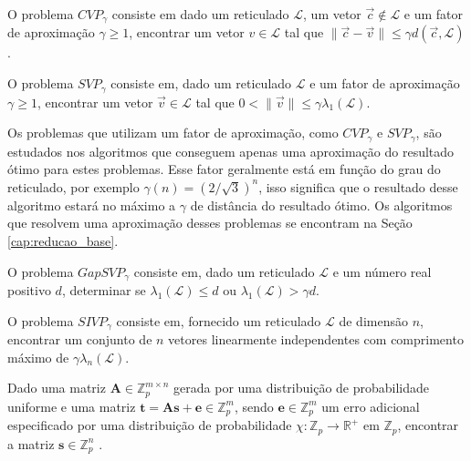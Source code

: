     \begin{definition}
        O problema $CVP_\gamma$ consiste em dado um reticulado $\mathcal{L}$, um vetor $\vec{c} \notin \mathcal{L}$ e um fator de aproximação $\gamma \ge 1$, encontrar um vetor $v \in \mathcal{L}$ tal que $\|\vec{c} - \vec{v}\| \le \gamma d(\vec{c}, \mathcal{L})$.
    \end{definition}

    \begin{definition}
         O problema $SVP_\gamma$ consiste em, dado um reticulado $\mathcal{L}$ e um fator de aproximação $\gamma \ge 1$, encontrar um vetor $\vec{v} \in \mathcal{L}$ tal que $0 < \lVert \vec{v} \rVert \le \gamma \lambda_{1}(\mathcal{L})$. 
    \end{definition}

    Os problemas que utilizam um fator de aproximação, como $CVP_\gamma$ e $SVP_\gamma$, são estudados nos algoritmos que conseguem apenas uma aproximação do resultado ótimo para estes problemas. Esse fator geralmente está em função do grau do reticulado, por exemplo $\gamma(n) = (2 / \sqrt{3})^n$, isso significa que o resultado desse algoritmo estará no máximo a $\gamma$ de distância do resultado ótimo. Os algoritmos que resolvem uma aproximação desses problemas se encontram na Seção \ref{cap:reducao_base}.

     \begin{definition}
        O problema $GapSVP_\gamma$ consiste em, dado um reticulado $\mathcal{L}$ e um número real positivo $d$, determinar se $\lambda_1(\mathcal{L}) \leq d$ ou $\lambda_1(\mathcal{L}) > \gamma d$.
    \end{definition}

    \begin{definition}
        O problema $SIVP_\gamma$ consiste em, fornecido um reticulado $\mathcal{L}$ de dimensão $n$, encontrar um conjunto de $n$ vetores linearmente independentes com comprimento máximo de $\gamma \lambda_{n}(\mathcal{L})$.
    \end{definition}
    
    \begin{definition}
        Dado uma matriz $\textbf{A} \in \mathbb{Z}_p^{m \times n}$ gerada por uma distribuição de probabilidade uniforme e uma matriz $\textbf{t} = \textbf{As} + \textbf{e} \in \mathbb{Z}_p^m$, sendo $\textbf{e} \in \mathbb{Z}_p^m$ um erro adicional especificado por uma distribuição de probabilidade $\chi:\mathbb{Z}_p \to \mathbb{R}^{+}$ em $\mathbb{Z}_p$, encontrar a matriz $\textbf{s} \in \mathbb{Z}_p^n$ \cite{regev}. 
    \end{definition}

